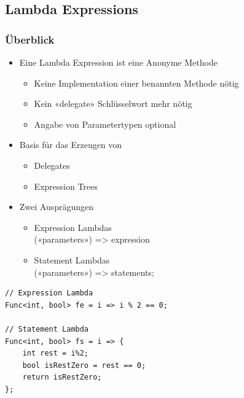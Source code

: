 \subsection{Lambda Expressions}
\subsubsection{Überblick}
\begin{itemize}
    \item Eine Lambda Expression ist eine Anonyme Methode
    \begin{itemize}
        \item Keine Implementation einer benannten Methode nötig
        \item Kein «delegate» Schlüsselwort mehr nötig
        \item Angabe von Parametertypen optional
    \end{itemize}
    \item Basis für das Erzeugen von
    \begin{itemize}
        \item Delegates
        \item Expression Trees
    \end{itemize}
    \item Zwei Ausprägungen
    \begin{itemize}
        \item Expression Lambdas\\
        («parameters») => expression
        \item Statement Lambdas\\
        («parameters») => { statements; }
    \end{itemize}
\end{itemize}

\begin{lstlisting}
// Expression Lambda
Func<int, bool> fe = i => i % 2 == 0;

// Statement Lambda
Func<int, bool> fs = i => {
    int rest = i%2;
    bool isRestZero = rest == 0;
    return isRestZero;
};
\end{lstlisting}

